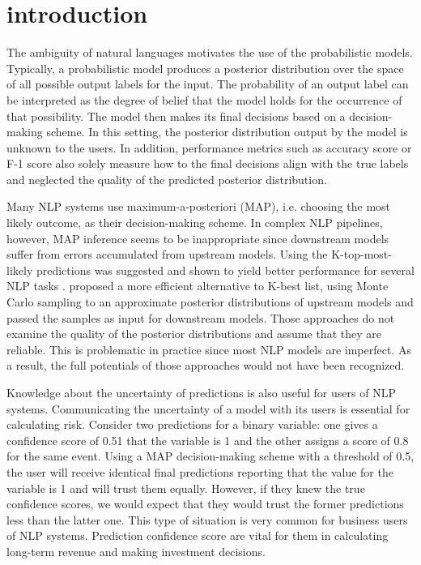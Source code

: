 \chapter{introduction}
\doublespacenormalsize
The ambiguity of natural languages motivates the use of the probabilistic models. Typically, a probabilistic model produces a posterior distribution over the space of all possible output labels for the input. The probability of an output label can be interpreted as the degree of belief that the model holds for the occurrence of that possibility. The model then makes its final decisions based on a decision-making scheme. In this setting, the posterior distribution output by the model is unknown to the users. In addition, performance metrics such as accuracy score or F-1 score also solely measure how to the final decisions align with the true labels and neglected the quality of the predicted posterior distribution. 

Many NLP systems use maximum-a-posteriori (MAP), i.e. choosing the most likely outcome, as their decision-making scheme. In complex NLP pipelines, however, MAP inference seems to be inappropriate since downstream models suffer from errors accumulated from upstream models. Using the K-top-most-likely predictions was suggested and shown to yield better performance for several NLP tasks \citep{sutton2005joint, wellner2004integrated}. \cite{finkel2006solving} proposed a more efficient alternative to K-best list, using Monte Carlo sampling to an approximate posterior distributions of upstream models and passed the samples as input for downstream models. Those approaches do not examine the quality of the posterior distributions and assume that they are reliable. This is problematic in practice since most NLP models are imperfect. As a result, the full potentials of those approaches would not have been recognized. 

Knowledge about the uncertainty of predictions is also useful for users of NLP systems. Communicating the uncertainty of a model with its users is essential for calculating risk. Consider two predictions for a binary variable: one gives a confidence score of 0.51 that the variable is 1 and the other assigns a score of 0.8 for the same event. Using a MAP decision-making scheme with a threshold of 0.5, the user will receive identical final predictions reporting that the value for the variable is 1 and will trust them equally. However, if they knew the true confidence scores, we would expect that they would trust the former predictions less than the latter one. This type of situation is very common for business users of NLP systems. Prediction confidence score are vital for them in calculating long-term revenue and making investment decisions.

